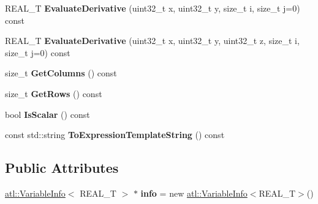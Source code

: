 \begin{DoxyCompactItemize}
\item 
\hypertarget{structatl_1_1_variable_ad8cb122781aab4ae18fe0898cc367567}{R\+E\+A\+L\+\_\+\+T {\bfseries Evaluate\+Derivative} (uint32\+\_\+t x, uint32\+\_\+t y, size\+\_\+t i, size\+\_\+t j=0) const }\label{structatl_1_1_variable_ad8cb122781aab4ae18fe0898cc367567}

\item 
\hypertarget{structatl_1_1_variable_a31574d4c65eca8ad0e1553525f568ca5}{R\+E\+A\+L\+\_\+\+T {\bfseries Evaluate\+Derivative} (uint32\+\_\+t x, uint32\+\_\+t y, uint32\+\_\+t z, size\+\_\+t i, size\+\_\+t j=0) const }\label{structatl_1_1_variable_a31574d4c65eca8ad0e1553525f568ca5}

\item 
\hypertarget{structatl_1_1_variable_a8014f00f3b2233bf46a83395e1bb9d79}{size\+\_\+t {\bfseries Get\+Columns} () const }\label{structatl_1_1_variable_a8014f00f3b2233bf46a83395e1bb9d79}

\item 
\hypertarget{structatl_1_1_variable_a92ae914f1792b5cdc2abc3c8a5f1e4d2}{size\+\_\+t {\bfseries Get\+Rows} () const }\label{structatl_1_1_variable_a92ae914f1792b5cdc2abc3c8a5f1e4d2}

\item 
\hypertarget{structatl_1_1_variable_a0e6e6a7b6dd2cc83d170beccbe900d36}{bool {\bfseries Is\+Scalar} () const }\label{structatl_1_1_variable_a0e6e6a7b6dd2cc83d170beccbe900d36}

\item 
\hypertarget{structatl_1_1_variable_a1d77872acc73fb4eaa3d55419cd4635c}{const std\+::string {\bfseries To\+Expression\+Template\+String} () const }\label{structatl_1_1_variable_a1d77872acc73fb4eaa3d55419cd4635c}

\end{DoxyCompactItemize}
\subsection*{Public Attributes}
\begin{DoxyCompactItemize}
\item 
\hypertarget{structatl_1_1_variable_a009aa3303bc1cca1d4df22a8404eec28}{\hyperlink{structatl_1_1_variable_info}{atl\+::\+Variable\+Info}$<$ R\+E\+A\+L\+\_\+\+T $>$ $\ast$ {\bfseries info} = new \hyperlink{structatl_1_1_variable_info}{atl\+::\+Variable\+Info}$<$R\+E\+A\+L\+\_\+\+T$>$()}\label{structatl_1_1_variable_a009aa3303bc1cca1d4df22a8404eec28}

\end{DoxyCompactItemize}
